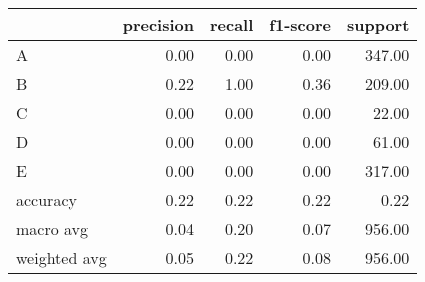 \begin{tabular}{|l|r|r|r|r|}
\hline
{} &  precision &  recall &  f1-score &  support \\
\hline
A            &       0.00 &    0.00 &      0.00 &   347.00 \\
B            &       0.22 &    1.00 &      0.36 &   209.00 \\
C            &       0.00 &    0.00 &      0.00 &    22.00 \\
D            &       0.00 &    0.00 &      0.00 &    61.00 \\
E            &       0.00 &    0.00 &      0.00 &   317.00 \\
accuracy     &       0.22 &    0.22 &      0.22 &     0.22 \\
macro avg    &       0.04 &    0.20 &      0.07 &   956.00 \\
weighted avg &       0.05 &    0.22 &      0.08 &   956.00 \\
\hline
\end{tabular}
